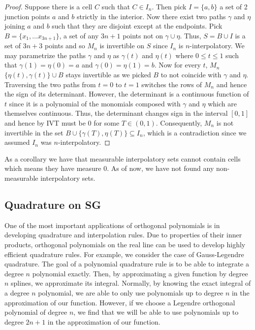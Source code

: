 \documentclass[12pt]{amsart}
\theoremstyle{plain}
\theoremstyle{definition}
\begin{document}
\begin{proof}
Suppose there is a cell $C$ such that $C \in I_n$. Then pick $I = \{a,b\}$ a set of 2 junction points $a$ and $b$ strictly in the interior. Now there exist two paths $\gamma$ and $\eta$ joining $a$ and $b$ such that they are disjoint except at the endpoints. Pick $B = \{x_1, \ldots x_{3n + 1}\}$, a set of any $3n + 1$ points not on $\gamma \cup \eta$. Thus, $S = B \cup I$ is a set of $3n + 3$ points and so $M_n$ is invertible on $S$ since $I_n$ is $n$-interpolatory. We may parametrize the paths $\gamma$ and $\eta$ as $\gamma(t)$ and $\eta(t)$ where $0 \leq t \leq 1$ such that $\gamma(1) = \eta(0) = a$ and $\gamma(0) = \eta(1) = b$. Now for every $t$, $M_n$ $\{\eta(t),\gamma(t)\} \cup B$ stays invertible as we picked $B$ to not coincide with $\gamma$ and $\eta$. Traversing the two paths from $t=0$ to $t=1$ switches the rows of $M_n$ and hence the sign of its determinant. However, the determinant is a continuous function of $t$ since it is a polynomial of the monomials composed with $\gamma$ and $\eta$ which are themselves continuous. Thus, the determinant changes sign in the interval $[0,1]$ and hence by IVT must be 0 for some $T \in (0,1)$. Consequently, $M_n$ is not invertible in the set $B \cup \{\gamma(T), \eta(T) \} \subseteq I_n$, which is a contradiction since we assumed $I_n$ was $n$-interpolatory.
\end{proof}

As a corollary we have that measurable interpolatory sets cannot contain cells which means they have measure 0. As of now, we have not found any non-measurable interpolatory sets. 

\subsection{Quadrature on SG}
One of the most important applications of orthogonal polynomials is in developing quadrature and interpolation rules. Due to properties of their inner products, orthogonal polynomials on the real line can be used to develop highly efficient quadrature rules. For example, we consider the case of Gauss-Legendre quadrature. The goal of a polynomial quadrature rule is to be able to integrate a degree $n$ polynomial exactly. Then, by approximating a given function by degree $n$ splines, we approximate its integral. Normally, by knowing the exact integral of a degree $n$ polynomial, we are able to only use polynomials up to degree $n$ in the approximation of our function. However, if we choose a Legendre orthogonal polynomial of degree $n$, we find that we will be able to use polynomials up to degree $2n+1$ in the approximation of our function.
\end{document}

